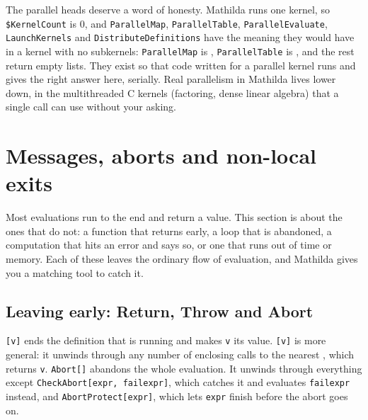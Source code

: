 \begin{codepairs}
\end{codepairs}

The parallel heads deserve a word of honesty. Mathilda runs one kernel, so
\texttt{\$KernelCount} is \(0\), and \texttt{ParallelMap}, \texttt{ParallelTable},
\texttt{ParallelEvaluate}, \texttt{LaunchKernels} and \texttt{DistributeDefinitions}
have the meaning they would have in a kernel with no subkernels: \texttt{ParallelMap}
is , \texttt{ParallelTable} is , and the rest return empty
lists. They exist so that code written for a
parallel kernel runs and gives the right answer here, serially. Real parallelism in
Mathilda lives lower down, in the multithreaded C kernels (factoring, dense linear
algebra) that a single call can use without your asking.

\section{Messages, aborts and non-local exits}
\label{sec:prog-messages}

Most evaluations run to the end and return a value. This section is about the ones
that do not: a function that returns early, a loop that is abandoned, a computation
that hits an error and says so, or one that runs out of time or memory. Each of
these leaves the ordinary flow of evaluation, and Mathilda gives you a matching tool
to catch it.

\subsection{Leaving early: Return, Throw and Abort}
\label{ssec:prog-exits}

\texttt{[v]} ends the definition that is running and makes \texttt{v} its
value. \texttt{[v]} is more general: it unwinds through any number of
enclosing calls to the nearest , which returns \texttt{v}. \texttt{Abort[]}
abandons the whole evaluation. It unwinds through everything except
\texttt{CheckAbort[expr, failexpr]}, which catches it and evaluates
\texttt{failexpr} instead, and \texttt{AbortProtect[expr]}, which lets \texttt{expr}
finish before the abort goes on.

